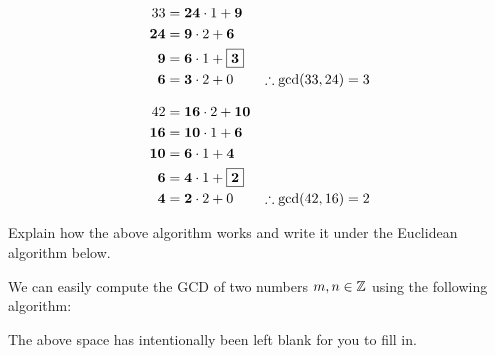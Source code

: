 \documentclass{ximera}
\begin{document}
\begin{align*}
33 &= \boldsymbol{24}\cdot 1 + \boldsymbol{9}\\
\boldsymbol{24} &= \boldsymbol{9} \cdot 2 + \boldsymbol{6}\\
\boldsymbol{9} &= \boldsymbol{6} \cdot 1 + \fbox{$\boldsymbol{3}$}\\
\boldsymbol{6} &= \boldsymbol{3} \cdot 2 + 0 \qquad \therefore \gcd(33,24) = 3 
\end{align*}

\begin{align*}
42 &= \boldsymbol{16}\cdot 2 + \boldsymbol{10}\\
\boldsymbol{16} &= \boldsymbol{10} \cdot 1 + \boldsymbol{6}\\
\boldsymbol{10} &= \boldsymbol{6} \cdot 1 + \boldsymbol{4}\\
\boldsymbol{6} &= \boldsymbol{4} \cdot 1 + \fbox{$\boldsymbol{2}$}\\
\boldsymbol{4} &= \boldsymbol{2} \cdot 2 + 0 \qquad \therefore \gcd(42,16) = 2 
\end{align*}

Explain how the above algorithm works and write it under the Euclidean
algorithm below.


\begin{theorem} 
We can easily compute the GCD of two numbers $m,n\in\mathbb Z$ using the
following algorithm:
\vspace{2in}

\end{theorem}
\noindent The above space has intentionally been left blank for you to
fill in.
\end{document}
